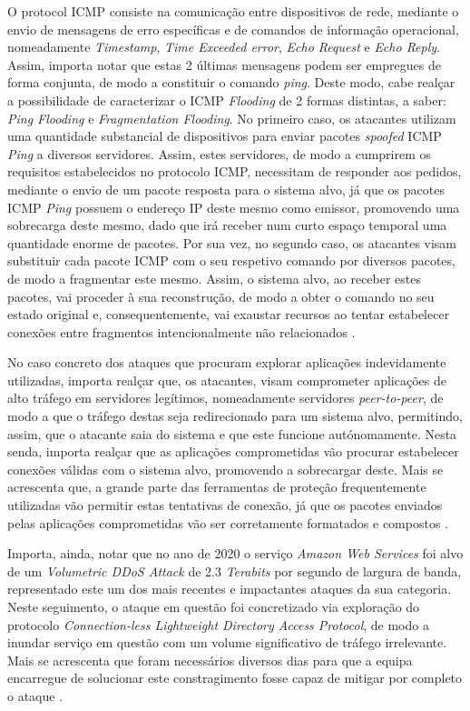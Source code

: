 O protocol ICMP consiste na comunicação entre dispositivos de rede, mediante o envio de mensagens de erro específicas e de comandos de informação operacional, nomeadamente \textit{Timestamp}, \textit{Time Exceeded error}, \textit{Echo Request} e \textit{Echo Reply}. Assim, importa notar que estas 2 últimas mensagens podem ser empregues de forma conjunta, de modo a constituir o comando \textit{ping}. Deste modo, cabe realçar a possibilidade de caracterizar o ICMP \textit{Flooding} de 2 formas distintas, a saber: \textit{Ping Flooding} e \textit{Fragmentation Flooding}. No primeiro caso, os atacantes utilizam uma quantidade substancial de dispositivos para enviar pacotes \textit{spoofed} ICMP \textit{Ping} a diversos servidores. Assim, estes servidores, de modo a cumprirem os requisitos estabelecidos no protocolo ICMP, necessitam de responder aos pedidos, mediante o envio de um pacote resposta para o sistema alvo, já que os pacotes ICMP \textit{Ping} possuem o endereço IP deste mesmo como emissor, promovendo uma sobrecarga deste mesmo, dado que irá receber num curto espaço temporal uma quantidade enorme de pacotes. Por sua vez, no segundo caso, os atacantes visam substituir cada pacote ICMP com o seu respetivo comando por diversos pacotes, de modo a fragmentar este mesmo. Assim, o sistema alvo, ao receber estes pacotes, vai proceder à sua reconstrução, de modo a obter o comando no seu estado original e, consequentemente, vai exaustar recursos ao tentar estabelecer conexões entre fragmentos intencionalmente não relacionados \cite{esecurityplanet_types_of_ddos_attacks}.

No caso concreto dos ataques que procuram explorar aplicações indevidamente utilizadas, importa realçar que, os atacantes, visam comprometer aplicações de alto tráfego em servidores legítimos, nomeadamente servidores \textit{peer-to-peer}, de modo a que o tráfego destas seja redirecionado para um sistema alvo, permitindo, assim, que o atacante saia do sistema e que este funcione autónomamente. Nesta senda, importa realçar que as aplicações comprometidas vão procurar estabelecer conexões válidas com o sistema alvo, promovendo a sobrecargar deste. Mais se acrescenta que, a grande parte das ferramentas de proteção frequentemente utilizadas vão permitir estas tentativas de conexão, já que os pacotes enviados pelas aplicações comprometidas vão ser corretamente formatados e compostos \cite{esecurityplanet_types_of_ddos_attacks}.

Importa, ainda, notar que no ano de 2020 o serviço \textit{Amazon Web Services} foi alvo de um \textit{Volumetric DDoS Attack} de 2.3 \textit{Terabits} por segundo de largura de banda, representado este um dos mais recentes e impactantes ataques da sua categoria. Neste seguimento, o ataque em questão foi concretizado via exploração do protocolo \textit{Connection-less Lightweight Directory Access Protocol}, de modo a inundar serviço em questão com um volume significativo de tráfego irrelevante. Mais se acrescenta que foram necessários diversos dias para que a equipa encarregue de solucionar este constragimento fosse capaz de mitigar por completo o ataque \cite{connectwise_types_of_ddos_attacks,aws_ddos_2020}.

